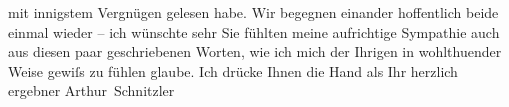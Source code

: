 \begin{ledgroupsized}[t]{13cm}
               mit innigstem Vergnügen gelesen habe. Wir begegnen einander hoffentlich beide einmal
               wieder – ich wünschte sehr Sie fühlten meine aufrichtige Sympathie auch aus diesen
               paar geschrie{\pb}benen Worten, wie ich mich
               der Ihrigen in wohlthuender Weise gewiſs zu fühlen glaube. Ich drücke Ihnen die Hand
               als Ihr herzlich ergebner\pend
           \pstart \spacefill\mbox{Arthur Schnitzler}\pend{}
         
         \endnumbering{}\end{ledgroupsized}  \newcommand{\dateiname}{L02416}\newcommand{\titel}{Arthur Schnitzler an Felix Braun, 19. 10. 1924}\newcommand{\editorInnen}{Martin Anton Müller und Gerd-Hermann Susen}
      